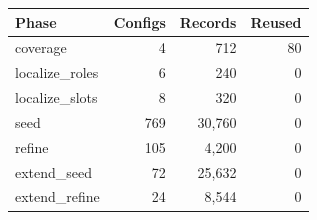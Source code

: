 \begin{tabular}{lrrr}
\toprule
Phase & Configs & Records & Reused \\
\midrule
coverage & 4 & 712 & 80 \\
localize\_roles & 6 & 240 & 0 \\
localize\_slots & 8 & 320 & 0 \\
seed & 769 & 30,760 & 0 \\
refine & 105 & 4,200 & 0 \\
extend\_seed & 72 & 25,632 & 0 \\
extend\_refine & 24 & 8,544 & 0 \\
\bottomrule
\end{tabular}
